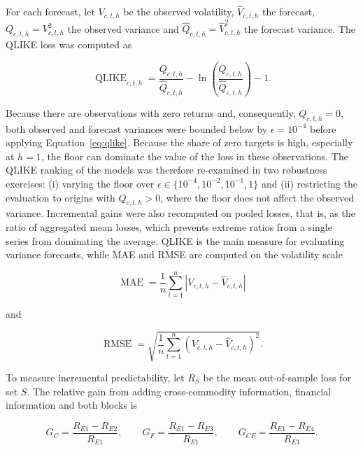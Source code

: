 \documentclass[a4paper,fleqn]{cas-sc}
\begin{document}
For each forecast, let \(V_{c,t,h}\) be the observed volatility, \(\widehat{V}_{c,t,h}\) the forecast, \(Q_{c,t,h}=V_{c,t,h}^{2}\) the observed variance and \(\widehat{Q}_{c,t,h}=\widehat{V}_{c,t,h}^{2}\) the forecast variance. The QLIKE loss was computed as

\begin{equation}
\operatorname{QLIKE}_{c,t,h}
=
\frac{Q_{c,t,h}}{\widehat{Q}_{c,t,h}}
-\ln\left(\frac{Q_{c,t,h}}{\widehat{Q}_{c,t,h}}\right)-1.
\label{eq:qlike}
\end{equation}

Because there are observations with zero returns and, consequently, \(Q_{c,t,h}=0\), both observed and forecast variances were bounded below by \(\epsilon=10^{-4}\) before applying Equation~\ref{eq:qlike}. Because the share of zero targets is high, especially at \(h=1\), the floor can dominate the value of the loss in these observations. The QLIKE ranking of the models was therefore re-examined in two robustness exercises: (i) varying the floor over \(\epsilon\in\{10^{-4},10^{-2},10^{-1},1\}\) and (ii) restricting the evaluation to origins with \(Q_{c,t,h}>0\), where the floor does not affect the observed variance. Incremental gains were also recomputed on pooled losses, that is, as the ratio of aggregated mean losses, which prevents extreme ratios from a single series from dominating the average. QLIKE is the main measure for evaluating variance forecasts, while MAE and RMSE are computed on the volatility scale

\begin{equation}
\operatorname{MAE}
=
\frac{1}{n}\sum_{t=1}^{n}
\left\lvert V_{c,t,h}-\widehat{V}_{c,t,h}\right\rvert
\label{eq:mae}
\end{equation}

and

\begin{equation}
\operatorname{RMSE}
=
\sqrt{
\frac{1}{n}\sum_{t=1}^{n}
\left(V_{c,t,h}-\widehat{V}_{c,t,h}\right)^{2}
}.
\label{eq:rmse}
\end{equation}

To measure incremental predictability, let \(R_S\) be the mean out-of-sample loss for set \(S\). The relative gain from adding cross-commodity information, financial information and both blocks is

\begin{equation}
G_C=\frac{R_{E1}-R_{E2}}{R_{E1}},
\qquad
G_F=\frac{R_{E1}-R_{E3}}{R_{E1}},
\qquad
G_{CF}=\frac{R_{E1}-R_{E4}}{R_{E1}}.
\label{eq:incremental_gain}
\end{equation}
\end{document}
